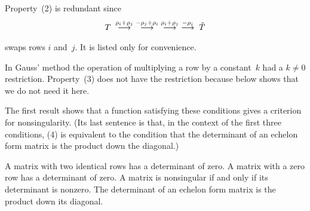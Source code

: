 \begin{remark}  \label{rem:SwapRowsRedun}
Property~(2) is redundant since
\begin{equation*}
   T\;\mathrel{ \mathop{\longrightarrow}\limits^{\rho_i+\rho_j\mathstrut}_{ \begin{subarray}{l} \relax \end{subarray}}}
    \;\mathrel{ \mathop{\longrightarrow}\limits^{-\rho_j+\rho_i\mathstrut}_{ \begin{subarray}{l} \relax \end{subarray}}}
    \;\mathrel{ \mathop{\longrightarrow}\limits^{\rho_i+\rho_j\mathstrut}_{ \begin{subarray}{l} \relax \end{subarray}}}
    \;\mathrel{ \mathop{\longrightarrow}\limits^{-\rho_i\mathstrut}_{ \begin{subarray}{l} \relax \end{subarray}}}
    \;\hat{T}
\end{equation*}
swaps rows \( i \) and~\( j \).
It is listed only for convenience.
\end{remark}

\begin{remark}
In Gauss' method the operation of multiplying a row by a constant~$k$
had a $k\neq 0$ restriction. 
Property~(3) does not have the restriction because
 below shows that we do not need it here.
\end{remark}

The first result shows that a function satisfying these conditions
gives a criterion for nonsingularity.
(Its last sentence is that, in the context of the first
three conditions, (4) is equivalent to the condition
that the determinant of an echelon form matrix is the product down the 
diagonal.)

\begin{lemma}   \label{le:IdenRowsDetZero}
A matrix with two identical rows has a determinant of zero.
A matrix with a zero row has a determinant of zero.
A matrix is nonsingular if and only if its determinant is nonzero.
The determinant of an echelon form matrix is the product down its diagonal.
\end{lemma}

